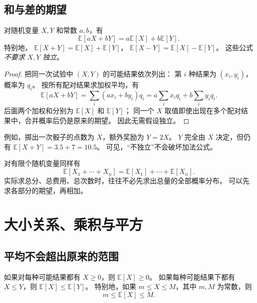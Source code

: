 \documentclass[UTF8,12pt,a4paper,fontset=fandol]{ctexart}
\begin{document}
\subsection{和与差的期望}

\begin{property}[期望的线性性]
\label{prop:basic-expectation-linearity}
对随机变量 $X,Y$ 和常数 $a,b$，有
\begin{equation}
  \mathbb E[aX+bY]=a\mathbb E[X]+b\mathbb E[Y].
  \label{eq:basic-expectation-linearity}
\end{equation}
特别地，
$\mathbb E[X+Y]=\mathbb E[X]+\mathbb E[Y]$，
$\mathbb E[X-Y]=\mathbb E[X]-\mathbb E[Y]$。
这些公式\emph{不要求 $X,Y$ 独立}。
\end{property}

\begin{proof}
把同一次试验中 $(X,Y)$ 的可能结果依次列出：
第 $i$ 种结果为 $(x_i,y_i)$，概率为 $q_i$。
按所有配对结果求加权平均，有
\[
  \mathbb E[aX+bY]
  =\sum_i(ax_i+by_i)q_i
  =a\sum_i x_iq_i+b\sum_i y_iq_i.
\]
后面两个加权和分别为 $\mathbb E[X]$ 和 $\mathbb E[Y]$；
同一个 $X$ 取值即使出现在多个配对结果中，合并概率后仍是原来的期望。
因此无需假设独立。
\end{proof}

例如，掷出一次骰子的点数为 $X$，额外奖励为 $Y=2X$。
$Y$ 完全由 $X$ 决定，但仍有
$\mathbb E[X+Y]=3.5+7=10.5$。
可见，“不独立”不会破坏加法公式。

对有限个随机变量同样有
\[
  \mathbb E[X_1+\cdots+X_n]
  =\mathbb E[X_1]+\cdots+\mathbb E[X_n].
\]
实际求总分、总费用、总次数时，往往不必先求出总量的全部概率分布，
可以先求各部分的期望，再相加。

\section{大小关系、乘积与平方}
\label{sec:basic-expectation-other-properties}

\subsection{平均不会超出原来的范围}

\begin{property}[非负性与大小关系]
如果对每种可能结果都有 $X\geq0$，则 $\mathbb E[X]\geq0$。
如果每种可能结果下都有 $X\leq Y$，则 $\mathbb E[X]\leq\mathbb E[Y]$。
特别地，如果 $m\leq X\leq M$，其中 $m,M$ 为常数，则
\[
  m\leq\mathbb E[X]\leq M.
\]
\end{property}
\end{document}
